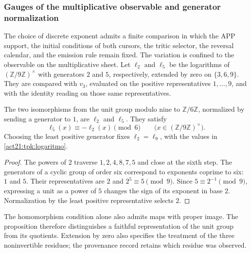 \subsubsection{Gauges of the multiplicative observable and generator normalization}
\label{mg05:calibres}

The choice of discrete exponent admits a finite comparison in which
the APP support, the initial conditions of both cursors, the tritic
selector, the reversal calendar, and the emission rule remain fixed.
The variation is confined to the observable on the multiplicative
sheet. Let \(\ell_{2}\) and \(\ell_{5}\) be the logarithms of
\((\mathbb Z/9\mathbb Z)^\times\) with generators \(2\) and
\(5\), respectively, extended by zero on \(\{3,6,9\}\).
They are compared with \(v_3\), evaluated on the positive
representatives \(1,\ldots,9\), and with the identity reading on
those same representatives.

\begin{proposition}
\label{mg05:normalizacion}
The two isomorphisms from the unit group modulo nine to
\(\mathbb Z/6\mathbb Z\), normalized by sending a generator to
\(1\), are \(\ell_2\) and \(\ell_5\). They satisfy
\[
 \ell_5(x)\equiv-\ell_2(x)\pmod6
 \qquad\bigl(x\in(\mathbb Z/9\mathbb Z)^\times\bigr).
\]
Choosing the least positive generator fixes \(\ell_2=\ell_9\),
with the values in \eqref{act21:tpk:logaritmo}.
\end{proposition}
\begin{proof}
The powers of \(2\) traverse \(1,2,4,8,7,5\) and close at the
sixth step. The generators of a cyclic group of order six correspond
to exponents coprime to six: \(1\) and \(5\). Their representatives
are \(2\) and \(2^5\equiv5\pmod9\).
Since \(5\equiv2^{-1}\pmod9\), expressing a unit as a power of
\(5\) changes the sign of its exponent in base \(2\).
Normalization by the least positive representative selects \(2\).
\end{proof}

The homomorphism condition alone also admits maps with proper image.
The proposition therefore distinguishes a faithful representation of
the unit group from its quotients. Extension by zero also specifies
the treatment of the three noninvertible residues; the provenance
record retains which residue was observed.

